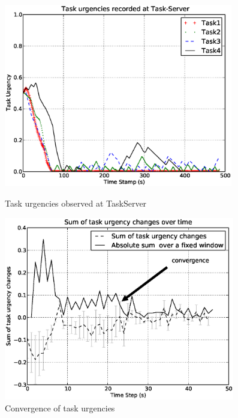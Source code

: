 \documentclass{llncs}
\begin{document}
\begin{figure}
\centering
\includegraphics[height=8cm, angle=0]
{images/global/GlobalPlotUrgencyLog-2010Feb18-151600-clear.eps}
\caption{\small Task urgencies observed at TaskServer}
\label{fig:raw-urgencies} %
\centering
\includegraphics[height=8cm, angle=0]{images/global/TaskUrgencyConvergence-step2-th-p1.eps}
\caption{\small  Convergence of task urgencies}
\label{fig:urgency-convergence} %
\end{figure}
\end{document}

